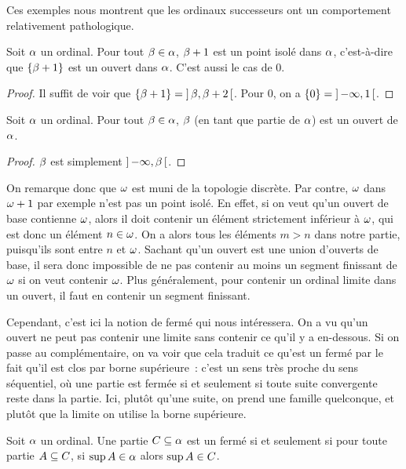 Ces exemples nous montrent que les ordinaux successeurs ont un comportement
relativement pathologique.

\begin{proposition}
  Soit $\alpha$ un ordinal. Pour tout $\beta \in \alpha$, $\beta + 1$ est un
  point isolé dans $\alpha$, c'est-à-dire que $\{\beta + 1\}$ est un ouvert
  dans $\alpha$. C'est aussi le cas de $0$.
\end{proposition}

\begin{proof}
  Il suffit de voir que $\{\beta + 1\} = \mathord{\left]\,\beta,\beta + 2\,\right[}$. Pour $0$,
  on a $\{0\} = \mathord{\left]\,\mathord{-}\infty,1\,\right[}$.
\end{proof}

\begin{proposition}
  Soit $\alpha$ un ordinal. Pour tout $\beta \in \alpha$, $\beta$ (en tant que
  partie de $\alpha$) est un ouvert de $\alpha$.
\end{proposition}

\begin{proof}
  $\beta$ est simplement $\mathord{\left]\,\mathord{-}\infty,\beta\,\right[}$.
\end{proof}

On remarque donc que $\omega$ est muni de la topologie discrète. Par contre, $\omega$
dans $\omega + 1$ par exemple n'est pas un point isolé. En effet, si on veut qu'un
ouvert de base contienne $\omega$, alors il doit contenir un élément strictement
inférieur à $\omega$, qui est donc un élément $n \in \omega$. On a alors tous les
éléments $m > n$ dans notre partie, puisqu'ils sont entre $n$ et $\omega$. Sachant
qu'un ouvert est une union d'ouverts de base, il sera donc impossible de ne pas
contenir au moins un segment finissant de $\omega$ si on veut contenir $\omega$. Plus
généralement, pour contenir un ordinal limite dans un ouvert, il faut en
contenir un segment finissant.

Cependant, c'est ici la notion de fermé qui nous intéressera. On a vu qu'un
ouvert ne peut pas contenir une limite sans contenir ce qu'il y a en-dessous.
Si on passe au complémentaire, on va voir que cela traduit ce qu'est un fermé
par le fait qu'il est clos par borne supérieure~: c'est un sens très proche du
sens séquentiel, où une partie est fermée si et seulement si toute suite
convergente reste dans la partie. Ici, plutôt qu'une suite, on prend une famille
quelconque, et plutôt que la limite on utilise la borne supérieure.

\begin{proposition}
  Soit $\alpha$ un ordinal. Une partie $C\subseteq \alpha$ est un fermé si
  et seulement si pour toute partie $A\subseteq C$, si
  $\sup A \in \alpha$ alors $\sup A \in C$.
\end{proposition}


